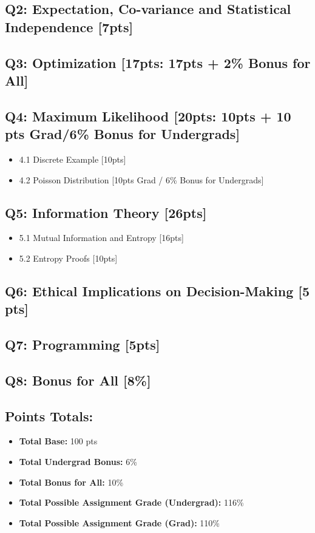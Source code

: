 \documentclass{article}
\begin{document}
\subsection*{Q2: Expectation, Co-variance and Statistical Independence [7pts]}
\subsection*{Q3: Optimization [17pts: 17pts + 2\% Bonus for All]}
\subsection*{Q4: Maximum Likelihood [20pts: 10pts + 10 pts Grad/6\% Bonus for Undergrads]}
\begin{itemize}
    \item 4.1 Discrete Example [10pts]
    \item 4.2 Poisson Distribution [10pts Grad / 6\% Bonus for Undergrads]
\end{itemize}
\subsection*{Q5: Information Theory [26pts]}
\begin{itemize}
    \item 5.1 Mutual Information and Entropy [16pts]
    \item 5.2 Entropy Proofs [10pts]
\end{itemize}
\subsection*{Q6: Ethical Implications on Decision-Making [5 pts]}
\subsection*{Q7: Programming [5pts]}
\subsection*{Q8: Bonus for All [8\%]}
\subsection*{Points Totals:}
\begin{itemize}
    \item \textbf{Total Base:} 100 pts
    \item \textbf{Total Undergrad Bonus:} 6\%
    \item \textbf{Total Bonus for All:} 10\%
    \item \textbf{Total Possible Assignment Grade (Undergrad):} 116\%
    \item \textbf{Total Possible Assignment Grade (Grad):} 110\%
\end{itemize}
\end{document}

